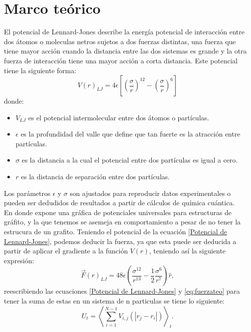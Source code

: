 \section{Marco teórico}
El potencial de Lennard-Jones describe la energía potencial de interacción entre dos átomos o moleculas netros sujetos a dos fuerzas distintas, una fuerza que tiene mayor acción cuando la distancia entre las dos sistemas es grande y la otra fuerza de interacción tiene una mayor acción a corta distancia. Este potencial tiene la siguiente forma:
\begin{equation}
    \label{Potencial de Lennard-Jones}
    V(r)_{LJ} = 4 \epsilon \left[\left(\frac{\sigma}{r} \right)^{12} - \left(\frac{\sigma}{r} \right)^6 \right]
\end{equation}
donde:
\begin{itemize}
    \item $V_{LJ}$ es el potencial intermolecular entre dos átomos o partículas.
    \item $\epsilon$ es la profundidad del valle que define que tan fuerte es la atracción entre partículas.
    \item $\sigma$ es la distancia a la cual el potencial entre dos partículas es igual a cero.
    \item $r$ es la distancia de separación entre dos partículas.
\end{itemize}
Los parámetros $\epsilon$ y $\sigma$ son ajustados para reproducir datos experimentales o pueden ser dedudidos de resultados a partir de cálculos de química cuántica.\\
En donde expone una gráfica de potenciales universales para estructuras de gráfito, y la que tenemos se asemeja en comportamiento a pesar de no tener la estrucura de un grafito.
Teniendo el potencial de la ecuación \ref{Potencial de Lennard-Jones}, podemos deducir la fuerza, ya que esta puede ser deducida a partir de aplicar el gradiente a la función $V(r)$, teniendo así la siguiente expresión:
\begin{equation}
    \label{eq:fuerzateo}
    \vec{F}(r)_{LJ}= 48\epsilon \left(\frac{\sigma^{12}}{r^{13}}- \frac{1}{2}\frac{\sigma^6}{r^7} \right) \hat{r},
\end{equation}
reescribiendo las ecuaciones \ref{Potencial de Lennard-Jones} y \ref{eq:fuerzateo} para tener la suma de estas en un sistema de n particulas se tiene lo siguiente:
\begin{equation}
    \label{eq:pot-n}
    U_t=\left\langle\sum_{i=1}^{N-1} V_{i,j}(|r_{j}-r_i|)\right\rangle_t.
\end{equation}
